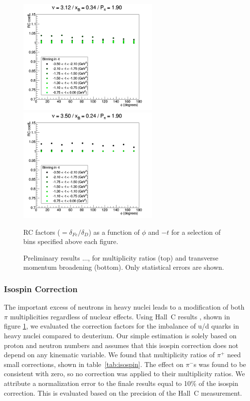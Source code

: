 \begin{figure}[tbp]
\includegraphics[width=7cm] {chap5-fig/ElecRadWei_Iron_11556.png}
\includegraphics[width=7cm] {chap5-fig/ElecRadWei_Iron_18956.png}
\caption {RC factors ($= \delta_{Fe} / \delta_D$) as a function of $\phi$ and 
$-t$ for a selection of bins specified above each figure.}
\label{fig:IsoSpin}
\end{figure}

\begin{figure}[tbp]
\centering
\caption {Preliminary results ..., 
for multiplicity ratios (top) and transverse momentum broadening 
(bottom). Only statistical errors are shown.}
\label{fig:RCPlots}
\end{figure}

\subsubsection{Isospin Correction}

The important excess of neutrons in heavy nuclei leads to a modification of 
both $\pi$ multiplicities regardless of nuclear effects. Using Hall~C results 
\cite{Asaturyan:2011mq}, shown in figure \ref{fig:IsoSpin}, we evaluated the 
correction factors for the imbalance of u/d quarks in heavy nuclei compared
to deuterium. Our simple estimation is solely based on proton and neutron 
numbers and assumes that this isospin correction does not depend on any
kinematic variable. We found that multiplicity ratios of $\pi^+$ need small
corrections, shown in table~\ref{tab:isospin}. The effect on $\pi^-$s was 
found to be consistent with zero, so no correction was applied to their 
multiplicity ratios. We attribute a normalization error to the finale results
equal to 10\% of the isospin correction. This is evaluated based on the 
precision of the Hall~C measurement.

